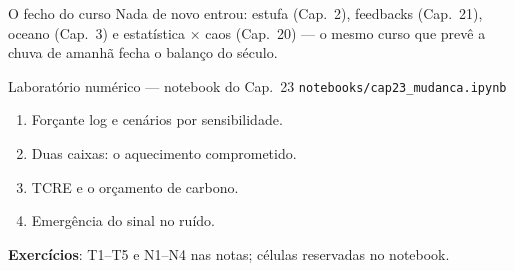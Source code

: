 \documentclass[aspectratio=169,11pt]{beamer}
\begin{document}
\begin{frame}{O fecho do curso}
  \vspace{0.6em}
  Nada de novo entrou: estufa (Cap.~2), feedbacks (Cap.~21), oceano
  (Cap.~3) e estatística × caos (Cap.~20) — o mesmo curso que prevê a
  chuva de amanhã fecha o balanço do século.
\end{frame}

\begin{frame}{Laboratório numérico --- notebook do Cap.~23}
  \texttt{notebooks/cap23\_mudanca.ipynb}
  \begin{enumerate}
    \item Forçante log e cenários por sensibilidade.
    \item Duas caixas: o aquecimento comprometido.
    \item TCRE e o orçamento de carbono.
    \item Emergência do sinal no ruído.
  \end{enumerate}
  \vspace{0.4em}
  \textbf{Exercícios}: T1--T5 e N1--N4 nas notas; células reservadas no
  notebook.
  \vfill
  \atribuicao
\end{frame}
\end{document}
